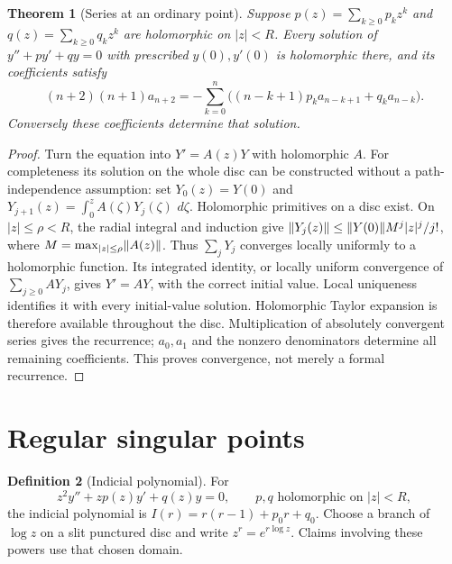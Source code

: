 \documentclass[11pt,oneside]{book}
\newtheorem{theorem}{Theorem}[chapter]
\theoremstyle{definition}
\newtheorem{definition}[theorem]{Definition}
\theoremstyle{remark}\newtheorem{remark}[theorem]{Remark}
\newcommand{\dd}{\,d}\newcommand{\id}{\operatorname{id}}
\begin{document}
\begin{theorem}[Series at an ordinary point]\label{d13:09:ordinary-series}
Suppose \(p(z)=\sum_{k\ge0}p_kz^k\) and
\(q(z)=\sum_{k\ge0}q_kz^k\) are holomorphic on \(|z|<R\).
Every solution of \(y''+py'+qy=0\) with prescribed \(y(0),y'(0)\)
is holomorphic there, and its coefficients satisfy
\[
 (n+2)(n+1)a_{n+2}
 =-\sum_{k=0}^n\big((n-k+1)p_ka_{n-k+1}+q_ka_{n-k}\big).
\]
Conversely these coefficients determine that solution.
\end{theorem}
\begin{proof}
Turn the equation into \(Y'=A(z)Y\) with holomorphic \(A\).
For completeness its solution on the whole disc can be constructed
without a path-independence assumption: set \(Y_0(z)=Y(0)\) and
\(Y_{j+1}(z)=\int_0^z A(\zeta)Y_j(\zeta)\,\dd\zeta\).
Holomorphic primitives on a disc exist. On \(|z|\le\rho<R\),
the radial integral and induction give
\(\lVert Y_j(z)\rVert\le\lVert Y(0)\rVert M^j|z|^j/j!\), where
\(M=\max_{|z|\le\rho}\lVert A(z)\rVert\).
Thus \(\sum_jY_j\) converges locally uniformly to a holomorphic function.
Its integrated identity, or locally uniform convergence of
\(\sum_{j\ge0} A Y_j\), gives \(Y'=AY\), with the correct initial value.
Local uniqueness identifies it with every initial-value solution.
Holomorphic Taylor expansion is therefore available throughout the
disc. Multiplication of absolutely convergent series gives the recurrence;
\(a_0,a_1\) and the nonzero denominators determine all remaining
coefficients. This proves convergence, not merely a formal recurrence.
\end{proof}

\section{Regular singular points}

\begin{definition}[Indicial polynomial]\label{d13:09:indicial}
For
\[
 z^2y''+zp(z)y'+q(z)y=0,\qquad p,q\text{ holomorphic on }|z|<R,
\]
the indicial polynomial is \(I(r)=r(r-1)+p_0r+q_0\).
Choose a branch of \(\log z\) on a slit punctured disc and write
\(z^r=e^{r\log z}\). Claims involving these powers use that chosen domain.
\end{definition}
\end{document}

